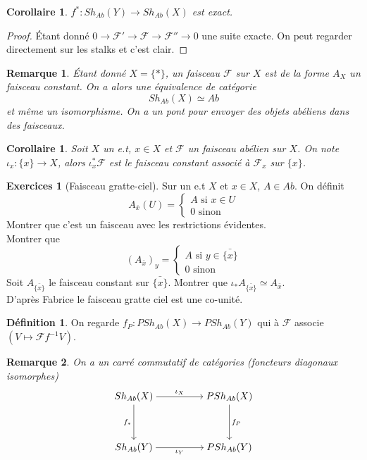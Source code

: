 \documentclass[a4paper,12pt]{book}
\newcommand{\F}{\mathscr F}
\theoremstyle{plain}
\newtheorem{cor}[subsection]{Corollaire}
\newtheorem{rem}{Remarque}
\theoremstyle{definition}
\newtheorem{defn}[subsection]{Définition}
\newtheorem{exo}[subsection]{Exercices}
\theoremstyle{remark}
\begin{document}
\begin{cor}
    $f^*\colon Sh_{Ab}(Y)\to Sh_{Ab}(X)$ est exact.
\end{cor}
\begin{proof}
    Étant donné $0\to \F'\to\F\to \F''\to 0$ une suite exacte. On peut
    regarder directement sur les stalks et c'est clair.
\end{proof}
\begin{rem}
    Étant donné $X=\{*\}$, un faisceau $\F$ sur $X$ est de la forme
    $A_X$ un faisceau constant. On a alors une équivalence de catégorie
    \[Sh_{Ab}(X)\simeq Ab\]
    et même un isomorphisme. On a un pont pour envoyer des objets 
    abéliens dans des faisceaux.
\end{rem}
\begin{cor}
    Soit $X$ un e.t, $x\in X$ et $\F$ un faisceau abélien sur $X$.
    On note $\iota_x\colon\{x\}\to X$, alors 
    $\iota_x^*\F$ est le faisceau constant associé à $\F_x$ sur $\{x\}$.
\end{cor}
\begin{exo}[Faisceau gratte-ciel]
    Sur un e.t $X$ et $x\in X$, $A\in Ab$. On définit
    \[A_{\bar x}(U)=\begin{cases}A\textrm{ si }x\in U\\ 0\textrm{ sinon}
    \end{cases}\]
    Montrer que c'est un faisceau avec les restrictions évidentes. \\
    Montrer que \[(A_{\bar x})_y=\begin{cases}A\textrm{ si } y\in\bar{\{x\}}\\ 0\textrm{ sinon}\end{cases}\]
    Soit $A_{\bar{\{x\}}}$ le faisceau constant sur $\bar{\{x\}}$. 
    Montrer que $\iota_* A_{\bar{\{x\}}}\simeq A_{\bar x}$. \\
    D'après Fabrice le faisceau gratte ciel est une co-unité.
\end{exo}
\begin{defn}
    On regarde $f_P\colon PSh_{Ab}(X)\to PSh_{Ab}(Y)$ qui à $\F$ associe
    $(V\mapsto \F f^{-1}V)$.
\end{defn}
\begin{rem}
    On a un carré commutatif de catégories (foncteurs diagonaux 
    isomorphes)
\[\begin{tikzcd}[ampersand replacement=\&,cramped]
	{Sh_{Ab}(X)} \&\& {PSh_{Ab}(X)} \\
	\\
	{Sh_{Ab}(Y)} \&\& {PSh_{Ab}(Y)}
	\arrow["{\iota_X}", from=1-1, to=1-3]
	\arrow["{f_*}"', from=1-1, to=3-1]
	\arrow["{f_P}", from=1-3, to=3-3]
	\arrow["{\iota_Y}"', from=3-1, to=3-3]
\end{tikzcd}\]
\end{rem}
\end{document}
